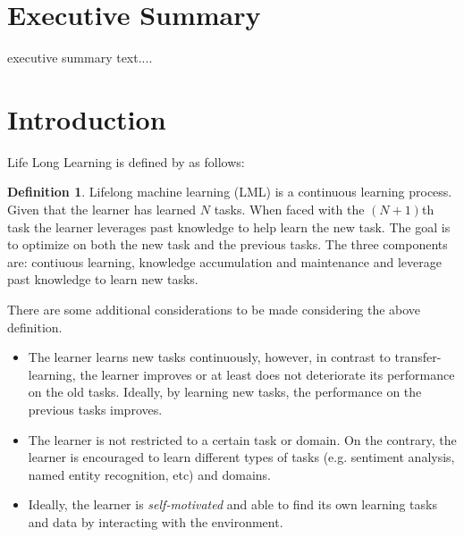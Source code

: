 \documentclass{lihlith}
\theoremstyle{definition}
\newtheorem{definition}{Definition}[section]
\theoremstyle{remark}
\begin{document}


\cleardoublepage
\begin{nwrrevisions}
 \nwrrevision{}{}{}{}{}
 \nwrrevision{}{}{}{}{}
\end{nwrrevisions}

\cleardoublepage
\section*{Executive Summary}

executive summary text....


\cleardoublepage
\tableofcontents
\cleardoublepage



\section{Introduction}
\label{sec:introduction}

Life Long Learning is defined by \cite{chen2016lifelong} as follows: 

\theoremstyle{definition}
\begin{definition}{Lifelong machine learning (LML)} is a continuous learning process. Given that the learner has learned $N$ tasks. When faced with the $(N+1)$th task the learner leverages past knowledge to help learn the new task. The goal is to optimize on both the new task and the previous tasks. The three components are: contiuous learning, knowledge accumulation and maintenance and leverage past knowledge to learn new tasks. 
\end{definition}
There are some additional considerations to be made considering the above definition. 
\begin{itemize}
\item The learner learns new tasks continuously, however, in contrast to transfer-learning, the learner improves or at least does not deteriorate its performance on the old tasks. Ideally, by learning new tasks, the performance on the previous tasks improves. 
\item The learner is not restricted to a certain task or domain. On the contrary, the learner is encouraged to learn different types of tasks (e.g. sentiment analysis, named entity recognition, etc) and domains. 
\item Ideally, the learner is \emph{self-motivated} and able to find its own learning tasks and data by interacting with the environment. 
\end{itemize}
\end{document}
